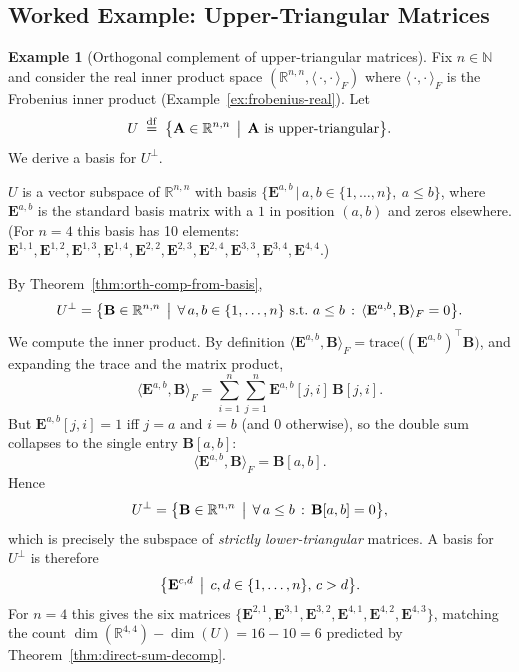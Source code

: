 \documentclass[11pt, a4paper, notitlepage]{report}
\theoremstyle{definition}
\newtheorem{example}[theorem]{Example}
\theoremstyle{remark}
\begin{document}
\subsection{Worked Example: Upper-Triangular Matrices}
\label{subsec:orth-comp-upper-triangular}

\begin{example}[Orthogonal complement of upper-triangular matrices]
\label{ex:orth-comp-upper-triangular}
Fix $n\in\mathbb{N}$ and consider the real inner product space
$(\mathbb{R}^{n,n},\langle\,\cdot,\cdot\,\rangle_F)$ where $\langle\,\cdot,\cdot\,\rangle_F$ is
the Frobenius inner product (Example~\ref{ex:frobenius-real}). Let
\[
  U \;\stackrel{\mathrm{df}}{=}\; \bigl\{\mathbf{A}\in\mathbb{R}^{n,n} \,\bigm|\, \mathbf{A}\text{ is upper-triangular}\bigr\}.
\]
We derive a basis for $U^\perp$.

\smallskip
$U$ is a vector subspace of $\mathbb{R}^{n,n}$ with basis
$\{\mathbf{E}^{a,b} \,|\, a,b\in\{1,\ldots,n\},\ a\leq b\}$, where
$\mathbf{E}^{a,b}$ is the standard basis matrix with a $1$ in position
$(a,b)$ and zeros elsewhere. (For $n=4$ this basis has 10 elements:
$\mathbf{E}^{1,1},\mathbf{E}^{1,2},\mathbf{E}^{1,3},\mathbf{E}^{1,4},\mathbf{E}^{2,2},\mathbf{E}^{2,3},\mathbf{E}^{2,4},\mathbf{E}^{3,3},\mathbf{E}^{3,4},\mathbf{E}^{4,4}$.)

By Theorem~\ref{thm:orth-comp-from-basis},
\[
  U^\perp = \bigl\{\mathbf{B}\in\mathbb{R}^{n,n} \,\bigm|\,
    \forall\,a,b\in\{1,\ldots,n\}\text{ s.t.\ }a\leq b\,:\, \langle\mathbf{E}^{a,b},\mathbf{B}\rangle_F = 0\bigr\}.
\]
We compute the inner product. By definition $\langle\mathbf{E}^{a,b},\mathbf{B}\rangle_F = \mathrm{trace}\bigl((\mathbf{E}^{a,b})^\top\mathbf{B}\bigr)$,
and expanding the trace and the matrix product,
\[
  \langle\mathbf{E}^{a,b},\mathbf{B}\rangle_F
  = \sum_{i=1}^{n}\sum_{j=1}^{n}\mathbf{E}^{a,b}[j,i]\,\mathbf{B}[j,i].
\]
But $\mathbf{E}^{a,b}[j,i] = 1$ iff $j=a$ and $i=b$ (and $0$ otherwise), so the
double sum collapses to the single entry $\mathbf{B}[a,b]$:
\[
  \langle\mathbf{E}^{a,b},\mathbf{B}\rangle_F = \mathbf{B}[a,b].
\]
Hence
\[
  U^\perp = \bigl\{\mathbf{B}\in\mathbb{R}^{n,n} \,\bigm|\,
    \forall\,a\leq b\,:\, \mathbf{B}[a,b] = 0\bigr\},
\]
which is precisely the subspace of \emph{strictly lower-triangular}
matrices. A basis for $U^\perp$ is therefore
\[
  \bigl\{\mathbf{E}^{c,d} \,\bigm|\, c,d\in\{1,\ldots,n\},\, c > d\bigr\}.
\]
For $n=4$ this gives the six matrices
$\{\mathbf{E}^{2,1},\mathbf{E}^{3,1},\mathbf{E}^{3,2},\mathbf{E}^{4,1},\mathbf{E}^{4,2},\mathbf{E}^{4,3}\}$,
matching the count $\dim(\mathbb{R}^{4,4}) - \dim(U) = 16 - 10 = 6$ predicted by
Theorem~\ref{thm:direct-sum-decomp}.
\end{example}
\end{document}
